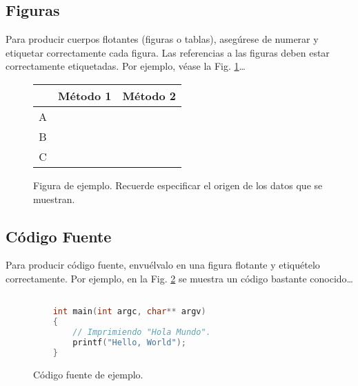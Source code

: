 \documentclass[a4paper,10pt,twocolumn]{article}
\begin{document}
	\subsection{Figuras}\label{sub:figures}
		Para producir cuerpos flotantes (figuras o tablas), asegúrese de numerar
		y etiquetar correctamente cada figura. Las referencias a las figuras deben
		estar correctamente etiquetadas. Por ejemplo, véase la Fig. \ref{fig:ex}\ldots

		\begin{figure}[h!]%
		\begin{center}
			\begin{tabular}{|c|c|c|} \hline
			 			& Método 1 	& Método 2 	\\ \hline
			A 			&  			&  			\\ \hline
			B			& 			& 			\\ \hline
			C 			& 			&  			\\ \hline
			\end{tabular}
		\caption{Figura de ejemplo. Recuerde especificar el origen de los datos que se muestran. \label{fig:ex}}
		\end{center}
		\end{figure}

	\subsection{Código Fuente}\label{sub:listings}
		Para producir código fuente, envuélvalo en una figura flotante y
		etiquételo correctamente. Por ejemplo, en la Fig. \ref{fig:code}
		se muestra un código bastante conocido\ldots


		\begin{figure}[htb]%
			\begin{lstlisting}[language=c]%

    int main(int argc, char** argv)
    {
        // Imprimiendo "Hola Mundo".
        printf("Hello, World");
    }

			\end{lstlisting}
		\caption{Código fuente de ejemplo.\label{fig:code}}
		\end{figure}
\end{document}
